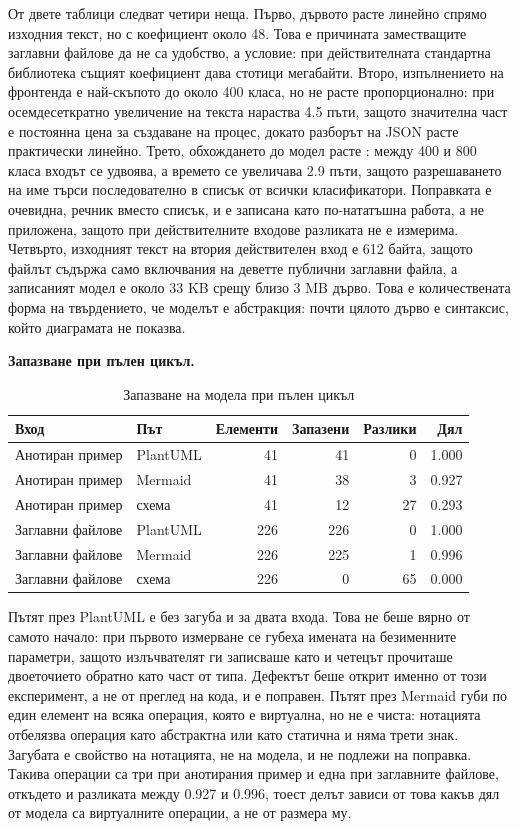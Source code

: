 От двете таблици следват четири неща. Първо, дървото расте линейно спрямо изходния текст, но с
коефициент около 48. Това е причината заместващите заглавни файлове да не са удобство, а условие: при
действителната стандартна библиотека същият коефициент дава стотици мегабайти. Второ, изпълнението на
фронтенда е най-скъпото до около 400 класа, но не расте пропорционално: при осемдесеткратно увеличение
на текста нараства 4.5 пъти, защото значителна част е постоянна цена за създаване на процес, докато
разборът на JSON расте практически линейно. Трето, обхождането до модел расте : между 400 и 800 класа входът се удвоява, а времето се увеличава 2.9 пъти, защото
разрешаването на име търси последователно в списък от всички класификатори. Поправката е очевидна,
речник вместо списък, и е записана като по-нататъшна работа, а не приложена, защото при действителните
входове разликата не е измерима. Четвърто, изходният текст на втория действителен вход е 612 байта,
защото файлът съдържа само включвания на деветте публични заглавни файла, а записаният модел е около 33
KB срещу близо 3 MB дърво. Това е количествената форма на твърдението, че моделът е абстракция: почти
цялото дърво е синтаксис, който диаграмата не показва.

\textbf{Запазване при пълен цикъл.}
\begin{table}[H]
\caption{Запазване на модела при пълен цикъл}
\label{tab:roundtrip}
\centering
{}
\fontsize{10}{12}\selectfont
\begin{tabular}{@{}L{3.7cm}L{2.2cm}rrrr@{}}
\toprule
\textbf{Вход} & \textbf{Път} & \textbf{Елементи} & \textbf{Запазени} & \textbf{Разлики} & \textbf{Дял} \\
\midrule
Анотиран пример & PlantUML & 41 & 41 & 0 & 1.000 \\
Анотиран пример & Mermaid  & 41 & 38 & 3 & 0.927 \\
Анотиран пример & схема    & 41 & 12 & 27 & 0.293 \\
Заглавни файлове & PlantUML & 226 & 226 & 0 & 1.000 \\
Заглавни файлове & Mermaid  & 226 & 225 & 1 & 0.996 \\
Заглавни файлове & схема    & 226 & 0 & 65 & 0.000 \\
\bottomrule
\end{tabular}
\end{table}

Пътят през PlantUML е без загуба и за двата входа. Това не беше вярно от самото начало: при първото
измерване се губеха имената на безименните параметри, защото излъчвателят ги записваше като
 и четецът прочиташе двоеточието обратно като част от типа. Дефектът беше открит именно от
този експеримент, а не от преглед на кода, и е поправен. Пътят през Mermaid губи по един елемент на
всяка операция, която е виртуална, но не е чиста: нотацията отбелязва операция като абстрактна или като
статична и няма трети знак. Загубата е свойство на нотацията, не на модела, и не подлежи на поправка.
Такива операции са три при анотирания пример и една при заглавните файлове, откъдето и разликата между
0.927 и 0.996, тоест делът зависи от това какъв дял от модела са виртуалните операции, а не от размера
му.

